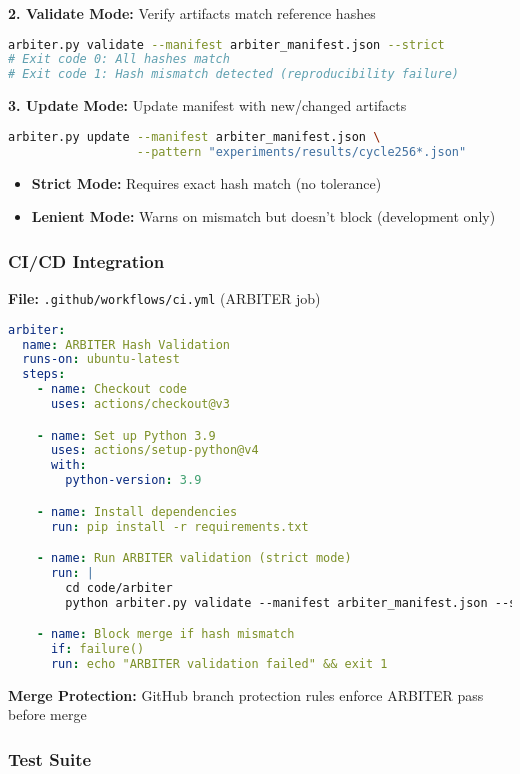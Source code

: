 \documentclass[11pt]{article}
\begin{document}
\textbf{2. Validate Mode:} Verify artifacts match reference hashes
\begin{lstlisting}[language=bash]
arbiter.py validate --manifest arbiter_manifest.json --strict
# Exit code 0: All hashes match
# Exit code 1: Hash mismatch detected (reproducibility failure)
\end{lstlisting}

\textbf{3. Update Mode:} Update manifest with new/changed artifacts
\begin{lstlisting}[language=bash]
arbiter.py update --manifest arbiter_manifest.json \
                  --pattern "experiments/results/cycle256*.json"
\end{lstlisting}

\begin{itemize}
\item \textbf{Strict Mode:} Requires exact hash match (no tolerance)
\item \textbf{Lenient Mode:} Warns on mismatch but doesn't block (development only)
\end{itemize}

\subsubsection{CI/CD Integration}

\textbf{File:} \texttt{.github/workflows/ci.yml} (ARBITER job)

\begin{lstlisting}[language=yaml]
arbiter:
  name: ARBITER Hash Validation
  runs-on: ubuntu-latest
  steps:
    - name: Checkout code
      uses: actions/checkout@v3

    - name: Set up Python 3.9
      uses: actions/setup-python@v4
      with:
        python-version: 3.9

    - name: Install dependencies
      run: pip install -r requirements.txt

    - name: Run ARBITER validation (strict mode)
      run: |
        cd code/arbiter
        python arbiter.py validate --manifest arbiter_manifest.json --strict

    - name: Block merge if hash mismatch
      if: failure()
      run: echo "ARBITER validation failed" && exit 1
\end{lstlisting}

\textbf{Merge Protection:} GitHub branch protection rules enforce ARBITER pass before merge

\subsubsection{Test Suite}
\end{document}

